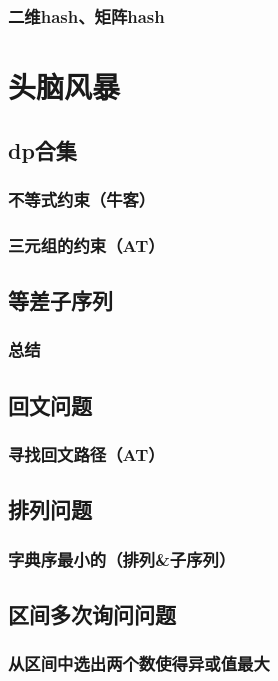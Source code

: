 \documentclass[10pt,a4paper]{article}
\begin{document}
	\subsubsection{二维hash、矩阵hash}
	
	\section{头脑风暴}
	\subsection{dp合集}
	\subsubsection{不等式约束（牛客）}
	
	\subsubsection{三元组的约束（AT）}
	
	\subsection{等差子序列}
	\subsubsection{总结}
	
	\subsection{回文问题}
	\subsubsection{寻找回文路径（AT）}
	
	\subsection{排列问题}
	\subsubsection{字典序最小的（排列\&子序列）}
	
	\subsection{区间多次询问问题}
	\subsubsection{从区间中选出两个数使得异或值最大}
	
\end{document}
